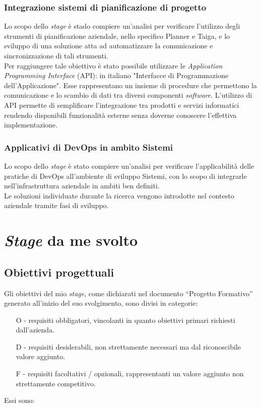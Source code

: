 \subsubsection*{Integrazione sistemi di pianificazione di progetto}
Lo scopo dello \emph{stage} è stado compiere un'analisi per verificare l'utilizzo degli strumenti di pianificazione aziendale, nello specifico Planner e Taiga, e lo sviluppo di una soluzione atta ad automatizzare la comunicazione e sincronizzazione di tali strumenti.\\
Per raggiungere tale obiettivo è stato possibile utilizzare le \emph{Application Programming Interface} (API): in italiano "Interfacce di Programmazione dell'Applicazione". Esse rappresentano un insieme di procedure che permettono la comunicazione e lo scambio di dati tra diversi componenti \emph{software}. L'utilizzo di API permette di semplificare l'integrazione tra prodotti e servizi informatici rendendo disponibili funzionalità esterne senza doverne conoscere l'effettiva implementazione.

\subsubsection*{Applicativi di DevOps in ambito Sistemi}
\label{stageDavide}
Lo scopo dello \emph{stage} è stato compiere un'analisi per verificare l'applicabilità delle pratiche di \gls{DevOps} all'ambiente di sviluppo \gls{Sistemi}, con lo scopo di integrarle nell'infrastruttura aziendale in ambiti ben definiti.\\
Le soluzioni individuate durante la ricerca vengono introdotte nel contesto aziendale tramite fasi di sviluppo. 


\section{\emph{Stage} da me svolto}
\subsection{Obiettivi progettuali}
Gli obiettivi del mio \emph{stage}, come dichiarati nel documento “Progetto Formativo” generato all'inizio del suo svolgimento, sono divisi in categorie:
\begin{enumerate}
	\item[O -]requisiti obbligatori, vincolanti in quanto obiettivi primari richiesti dall'azienda.
    \item[D -]requisiti desiderabili, non strettamente necessari ma dal riconoscibile valore aggiunto.
    \item[F -]requisiti facoltativi / opzionali, rappresentanti un valore aggiunto non strettamente competitivo.\\
\end{enumerate}
Essi sono:

